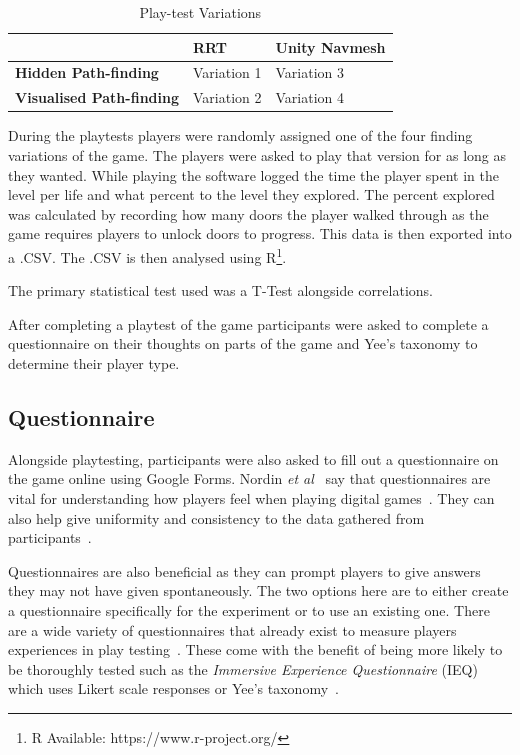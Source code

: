 \documentclass[journal]{IEEEtran}
\begin{document}
	\begin{table}[H]
		\centering
		\caption{Play-test Variations}
		\label{table:PlaytestVariations}
		\def\arraystretch{1.5}
		\begin{tabular}{ |l|l|l|}
			\hline
			& \textbf{RRT}& \textbf{Unity Navmesh} \\
			\hline
			\textbf{Hidden Path-finding}    & Variation 1            & Variation 3 \\
			\hline
			\textbf{Visualised Path-finding}& Variation 2              & Variation 4 \\
			\hline
		\end{tabular}
	\end{table}
	
	During the playtests players were randomly assigned one of the four finding variations of the game. The players were asked to play that version for as long as they wanted. While playing the software logged the time the player spent in the level per life and what percent to the level they explored. The percent explored was calculated by recording how many doors the player walked through as the game requires players to unlock doors to progress. This data is then exported into a .CSV. The .CSV is then analysed using R\footnote[2]{R Available: https://www.r-project.org/}.
	
	
	The primary statistical test used was a T-Test alongside correlations.
	
	After completing a playtest of the game participants were asked to complete a questionnaire on their thoughts on parts of the game and Yee's taxonomy to determine their player type.
	
	\subsection{Questionnaire} \label{Questionnaire}
	
	Alongside playtesting, participants were also asked to fill out a questionnaire on the game online using Google Forms. Nordin \textit{et al}~\cite{nordin2014} say that questionnaires are vital for understanding how players feel when playing digital games~\cite{nordin2014,Denisova2016}. They can also help give uniformity and consistency to the data gathered from participants~\cite{Denisova2016}.
	
	Questionnaires are also beneficial as they can prompt players to give answers they may not have given spontaneously. The two options here are to either create a questionnaire specifically for the experiment or to use an existing one. There are a wide variety of questionnaires that already exist to measure players experiences in play testing~\cite{nordin2014, Jennett2008}. These come with the benefit of being more likely to be thoroughly tested such as the \textit{ Immersive Experience Questionnaire} (IEQ) which uses Likert scale responses or Yee's taxonomy~\cite{nordin2014, Jennett2008, Yee2006, Yee2012}.
	
\end{document}
